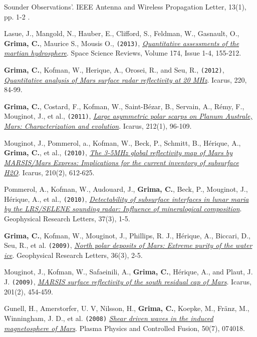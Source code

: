 \begin{etaremune}
{{  Sounder Observations'}}. IEEE Antenna and Wireless Propagation Letter,
  13(1), pp. 1-2 .
\item
  Lasue, J., Mangold, N., Hauber, E., Clifford, S., Feldman, W.,
  Gasnault, O., \textbf{Grima, C.}, Maurice S., Mousis O.,
  \texttt{(2013)},
  \emph{\href{http://www.ig.utexas.edu/pubs/scripts/readpdf.php?contrib=2628}{Quantitative
  assessments of the martian hydrosphere}}. Space Science Reviews,
  Volume 174, Issue 1-4, 155-212.
\item
  \textbf{Grima, C.}, Kofman, W., Herique, A., Orosei, R., and Seu, R.,
  \texttt{(2012)},
  \href{http://www.sciencedirect.com/science/article/pii/S0019103512001558}{\emph{Quantitative
  analysis of Mars surface radar reflectivity at 20 MHz}}. Icarus, 220,
  84-99.
\item
  \textbf{Grima, C.}, Costard, F., Kofman, W., Saint-Bézar, B., Servain,
  A., Rémy, F., Mouginot, J., et al., \texttt{(2011)},
  \href{http://www.sciencedirect.com/science/article/pii/S0019103510004859}{\emph{Large
  asymmetric polar scarps on Planum Australe, Mars: Characterization and
  evolution}}. Icarus, 212(1), 96-109.
\item
  Mouginot, J., Pommerol, a., Kofman, W., Beck, P., Schmitt, B.,
  Hérique, A., \textbf{Grima, C.}, et al., \texttt{(2010)},
  \href{https://www.google.com/url?sa=t\&rct=j\&q=\&esrc=s\&source=web\&cd=1\&cad=rja\&ved=0CDAQFjAA\&url=http\%3A\%2F\%2Fess.uci.edu\%2Fresearchgrp\%2Ferignot\%2Ffiles\%2Fmouginot_icarus_2010.pdf\&ei=j6inUdytH5HA9QSNx4FQ\&usg=AFQjCNHiVV4-tjSgM28QWYY64vKaSa2U4Q\&sig2=fGYDJTm_cOpv0rwZIGDX6A\&bvm=bv.47244034,d.eWU}{
  \emph{The 3-5MHz global reflectivity map of Mars by MARSIS/Mars
  Express: Implications for the current inventory of subsurface H2O}}.
  Icarus, 210(2), 612-625.
\item
  Pommerol, A., Kofman, W., Audouard, J., \textbf{Grima, C.}, Beck, P.,
  Mouginot, J., Hérique, A., et al., \texttt{(2010)},
  \href{http://onlinelibrary.wiley.com/doi/10.1029/2009GL041681/abstract}{\emph{Detectability
  of subsurface interfaces in lunar maria by the LRS/SELENE sounding
  radar: Influence of mineralogical composition}}. Geophysical Research
  Letters, 37(3), 1-5.
\item
  \textbf{Grima, C.}, Kofman, W., Mouginot, J., Phillips, R. J.,
  Hérique, A., Biccari, D., Seu, R., et al. \texttt{(2009)},
  \href{http://onlinelibrary.wiley.com/doi/10.1029/2008GL036326/abstract}{\emph{North
  polar deposits of Mars: Extreme purity of the water ice}}. Geophysical
  Research Letters, 36(3), 2-5.
\item
  Mouginot, J., Kofman, W., Safaeinili, A., \textbf{Grima, C.}, Hérique,
  A., and Plaut, J. J. \texttt{(2009)},
  \href{http://www.sciencedirect.com/science/article/pii/S0019103509000311}{
  \emph{MARSIS surface reflectivity of the south residual cap of Mars}}.
  Icarus, 201(2), 454-459.
\item
  Gunell, H., Amerstorfer, U. V, Nilsson, H., \textbf{Grima, C.},
  Koepke, M., Fränz, M., Winningham, J. D., et al. \texttt{(2008)}
  \href{http://iopscience.iop.org/0741-3335/50/7/074018}{\emph{Shear
  driven waves in the induced magnetosphere of Mars}}. Plasma Physics
  and Controlled Fusion, 50(7), 074018.
\end{etaremune}
